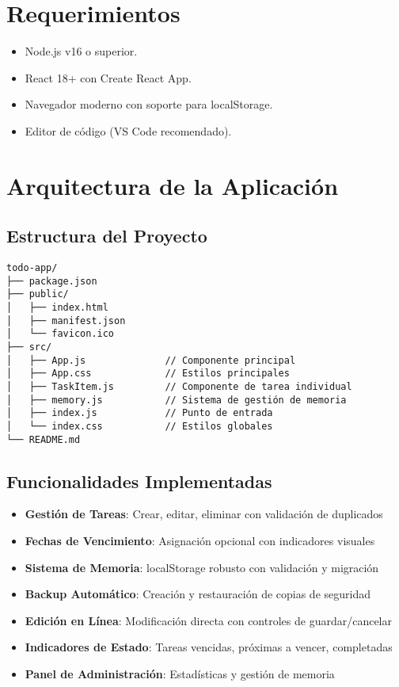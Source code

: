 \documentclass[12pt,a4paper]{article}
\begin{document}
\section{Requerimientos}
\begin{itemize}
  \item Node.js v16 o superior.
  \item React 18+ con Create React App.
  \item Navegador moderno con soporte para localStorage.
  \item Editor de código (VS Code recomendado).
\end{itemize}

\section{Arquitectura de la Aplicación}

\subsection{Estructura del Proyecto}
\begin{verbatim}
todo-app/
├── package.json
├── public/
│   ├── index.html
│   ├── manifest.json
│   └── favicon.ico
├── src/
│   ├── App.js              // Componente principal
│   ├── App.css             // Estilos principales
│   ├── TaskItem.js         // Componente de tarea individual
│   ├── memory.js           // Sistema de gestión de memoria
│   ├── index.js            // Punto de entrada
│   └── index.css           // Estilos globales
└── README.md
\end{verbatim}

\subsection{Funcionalidades Implementadas}
\begin{itemize}
  \item \textbf{Gestión de Tareas}: Crear, editar, eliminar con validación de duplicados
  \item \textbf{Fechas de Vencimiento}: Asignación opcional con indicadores visuales
  \item \textbf{Sistema de Memoria}: localStorage robusto con validación y migración
  \item \textbf{Backup Automático}: Creación y restauración de copias de seguridad
  \item \textbf{Edición en Línea}: Modificación directa con controles de guardar/cancelar
  \item \textbf{Indicadores de Estado}: Tareas vencidas, próximas a vencer, completadas
  \item \textbf{Panel de Administración}: Estadísticas y gestión de memoria
\end{itemize}
\end{document}
